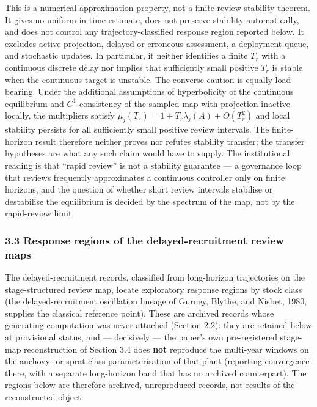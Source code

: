 \documentclass[11pt]{article}
\begin{document}
This is a numerical-approximation property, not a finite-review
stability theorem. It gives no uniform-in-time estimate, does not
preserve stability automatically, and does not control any
trajectory-classified response region reported below. It excludes active
projection, delayed or erroneous assessment, a deployment queue, and
stochastic updates. In particular, it neither identifies a finite
\(T_r\) with a continuous discrete delay nor implies that sufficiently
small positive \(T_r\) is stable when the continuous target is unstable.
The converse caution is equally load-bearing. Under the additional
assumptions of hyperbolicity of the continuous equilibrium and
\(C^1\)-consistency of the sampled map with projection inactive locally,
the multipliers satisfy \(\mu_j(T_r) = 1 + T_r\lambda_j(A) + O(T_r^2)\)
and local stability persists for all sufficiently small positive review
intervals. The finite-horizon result therefore neither proves nor
refutes stability transfer; the transfer hypotheses are what any such
claim would have to supply. The institutional reading is that ``rapid
review'' is not a stability guarantee --- a governance loop that reviews
frequently approximates a continuous controller only on finite horizons,
and the question of whether short review intervals stabilise or
destabilise the equilibrium is decided by the spectrum of the map, not
by the rapid-review limit.

\subsubsection{3.3 Response regions of the delayed-recruitment review
maps}\label{response-regions-of-the-delayed-recruitment-review-maps}

The delayed-recruitment records, classified from long-horizon
trajectories on the stage-structured review map, locate exploratory
response regions by stock class (the delayed-recruitment oscillation
lineage of Gurney, Blythe, and Nisbet, 1980, supplies the classical
reference point). These are archived records whose generating
computation was never attached (Section 2.2): they are retained below at
provisional status, and --- decisively --- the paper's own
pre-registered stage-map reconstruction of Section 3.4 does \textbf{not}
reproduce the multi-year windows on the anchovy- or sprat-class
parameterisation of that plant (reporting convergence there, with a
separate long-horizon band that has no archived counterpart). The
regions below are therefore archived, unreproduced records, not results
of the reconstructed object:
\end{document}
